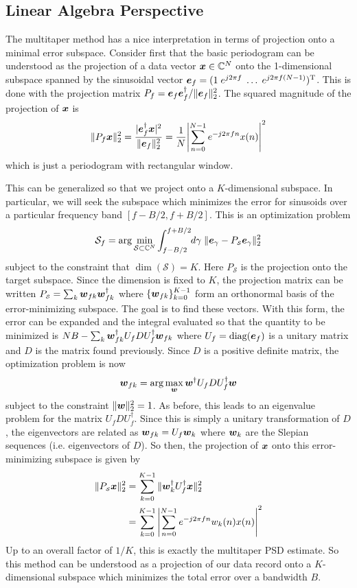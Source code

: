 \documentclass[twocolumn]{gwclass}
\newcommand{\C}{\mathbb{C}}
\begin{document}
\subsection{Linear Algebra Perspective}
The multitaper method has a nice interpretation in terms of projection onto a minimal error subspace. Consider first that the basic periodogram can be understood as the projection of a data vector $\*x\in\C^N$ onto the 1-dimensional subspace spanned by the sinusoidal vector $\boldsymbol{e}_f=(1\;e^{j2\pi f}\;\dots \;e^{j2\pi f(N-1)})^{\text{\normalfont{T}}}$. This is done with the projection matrix $P_f=\boldsymbol{e}_f \boldsymbol{e}_f^\dagger / \|\boldsymbol{e}_f\|_2^2$. The squared magnitude of the projection of $\boldsymbol{x}$ is
$$ \|P_f\boldsymbol{x}\|_2^2 = \frac{|\boldsymbol{e}_f^\dagger\boldsymbol{x}|^2}{\|\boldsymbol{e}_f\|_2^2}=\frac{1}{N}\abs{\sum_{n=0}^{N-1}e^{-j2\pi f n}x(n)}^2 $$
which is just a periodogram with rectangular window. 

This can be generalized so that we project onto a $K$-dimensional subspace. In particular, we will seek the subspace which minimizes the error for sinusoids over a particular frequency band $[f-B/2,f+B/2]$. This is an optimization problem
$$ \mathcal{S}_f = \arg\min_{\mathcal{S}\subset\C^N} \int_{ f-B/2}^{ f+B/2}\hspace{-0.25em}d\gamma\;\|\*e_\gamma - P_{\scriptscriptstyle\mathcal{S}}\*e_\gamma\|_2^2 $$
subject to the constraint that $\dim(\mathcal{S})=K$. Here $P_{\scriptscriptstyle\mathcal{S}}$ is the projection onto the target subspace. Since the dimension is fixed to $K$, the projection matrix can be written $P_{\scriptscriptstyle\mathcal{S}}=\sum_k \boldsymbol{w}_{fk}\boldsymbol{w}_{fk}^\dagger$ where $\{\boldsymbol{w}_{fk}\}_{k=0}^{K-1}$ form an orthonormal basis of the error-minimizing subspace. The goal is to find these vectors. With this form, the error can be expanded and the integral evaluated so that the quantity to be minimized is $ NB- \sum_k\boldsymbol{w}^\dagger_{fk} U_f D U_f^\dagger \boldsymbol{w}_{fk} $
where $U_f=\text{\normalfont{diag}}(\boldsymbol{e}_f)$ is a unitary matrix and $D$ is the matrix found previously. Since $D$ is a positive definite matrix, the optimization problem is now
$$ \boldsymbol{w}_{fk} = \arg\max_{\boldsymbol{w}} \boldsymbol{w}^\dagger U_f D U_f^\dagger\boldsymbol{w} $$
subject to the constraint $\|\boldsymbol{w}\|_2^2=1$. As before, this leads to an eigenvalue problem for the matrix $U_f D U_f^\dagger$. Since this is simply a unitary transformation of $D$, the eigenvectors are related as $\boldsymbol{w}_{fk}=U_f\boldsymbol{w}_k$ where $\boldsymbol{w}_k$ are the Slepian sequences (i.e. eigenvectors of $D$). So then, the projection of $\boldsymbol{x}$ onto this error-minimizing subspace is given by
\begin{align*} 
	\|P_{\scriptscriptstyle\mathcal{S}}\boldsymbol{x}\|_2^2 &= \sum_{k=0}^{K-1}\|\boldsymbol{w}^\dagger_kU_f^\dagger \boldsymbol{x}\|^2_2 \\
	&= \sum_{k=0}^{K-1}\abs{\sum_{n=0}^{N-1}e^{-j2\pi f n}w_k(n)x(n)}^2
\end{align*}
Up to an overall factor of $1/K$, this is exactly the multitaper PSD estimate. So this method can be understood as a projection of our data record onto a $K$-dimensional subspace which minimizes the total error over a bandwidth $B$.
\end{document}
